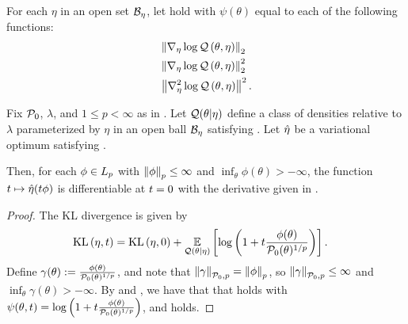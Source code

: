 \begin{assu}
%
For each $\eta$ in an open set $\mathcal{B}_\eta$, let  hold with
$\psi(\theta)$ equal to each of the following functions:
%
\begin{align*}
%
& \norm{\lqgrad{\theta, \eta}}_2 \\
& \norm{\lqgrad{\theta, \eta}}^2_2 \\
& \norm{\lqhess{\theta, \eta}}^2.
%
\end{align*}
%
\end{assu}



\begin{thm}
%
Fix $\mathcal{P}_{0}$, $\lambda$, and $1 \le p < \infty$ as in .
Let $\mathcal{Q}(\theta \vert \eta)$ define a class of densities relative to $\lambda$
parameterized by $\eta$ in an open ball $\mathcal{B}_\eta$ satisfying
.  Let $\hat\eta$ be a variational optimum satisfying
.

Then, for each $\phi \in {L_{p}}$ with $\left\Vert\phi\right\Vert_p \le \infty$ and
$\inf_\theta \phi(\theta) > -\infty$, the function $t \mapsto \hat\eta(t \phi)$
is differentiable at $t = 0$ with the derivative given in
.
%
\begin{proof}
%
The KL divergence is given by
%
\begin{align*}
%
\KL{\eta, \t} ={}&
    \KL{\eta, 0} +
    \expect{\q(\theta \vert \eta)}
           {\log \left(1 + \t \frac{\phi(\theta)}{\pbase(\theta)^{1/p}} \right)}.
%
\end{align*}
%
Define $\gamma(\theta) := \frac{\phi(\theta)}{\mathcal{P}_{0}(\theta)^{1/p}}$, and note
that $\left\Vert\gamma\right\Vert_{\mathcal{P}_{0}, p} = \left\Vert\phi\right\Vert_{p}$, so $\left\Vert\gamma\right\Vert_{\mathcal{P}_{0},
p} \le \infty$ and $\inf_\theta \gamma(\theta) > -\infty$.  By
 and , we have that that
 holds with $\psi(\theta, t) = \log \left(1 + t
\frac{\phi(\theta)}{\mathcal{P}_{0}(\theta)^{1/p}}\right)$, and 
holds.
%
\end{proof}
%
\end{thm}


